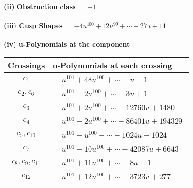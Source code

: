 \documentclass[1p]{elsarticle_modified}
\theoremstyle{definition}
\begin{document}
\flushleft \textbf{(ii) Obstruction class $= -1$}\\~\\
\flushleft \textbf{(iii) Cusp Shapes $= -4 u^{100}+12 u^{99}+\cdots-27 u+14$}\\~\\
\newpage\renewcommand{\arraystretch}{1}
\flushleft \textbf{(iv) u-Polynomials at the component}\newline \\
\begin{tabular}{m{50pt}|m{274pt}}
Crossings & \hspace{64pt}u-Polynomials at each crossing \\
\hline $$\begin{aligned}c_{1}\end{aligned}$$&$\begin{aligned}
&u^{101}+48 u^{100}+\cdots+u-1
\end{aligned}$\\
\hline $$\begin{aligned}c_{2},c_{6}\end{aligned}$$&$\begin{aligned}
&u^{101}-2 u^{100}+\cdots-3 u+1
\end{aligned}$\\
\hline $$\begin{aligned}c_{3}\end{aligned}$$&$\begin{aligned}
&u^{101}+2 u^{100}+\cdots+12760 u+1480
\end{aligned}$\\
\hline $$\begin{aligned}c_{4}\end{aligned}$$&$\begin{aligned}
&u^{101}-2 u^{100}+\cdots-86401 u+194329
\end{aligned}$\\
\hline $$\begin{aligned}c_{5},c_{10}\end{aligned}$$&$\begin{aligned}
&u^{101}- u^{100}+\cdots-1024 u-1024
\end{aligned}$\\
\hline $$\begin{aligned}c_{7}\end{aligned}$$&$\begin{aligned}
&u^{101}-10 u^{100}+\cdots-42087 u+6643
\end{aligned}$\\
\hline $$\begin{aligned}c_{8},c_{9},c_{11}\end{aligned}$$&$\begin{aligned}
&u^{101}+11 u^{100}+\cdots-8 u-1
\end{aligned}$\\
\hline $$\begin{aligned}c_{12}\end{aligned}$$&$\begin{aligned}
&u^{101}+12 u^{100}+\cdots+3723 u+277
\end{aligned}$\\
\hline
\end{tabular}\\~\\
\end{document}
